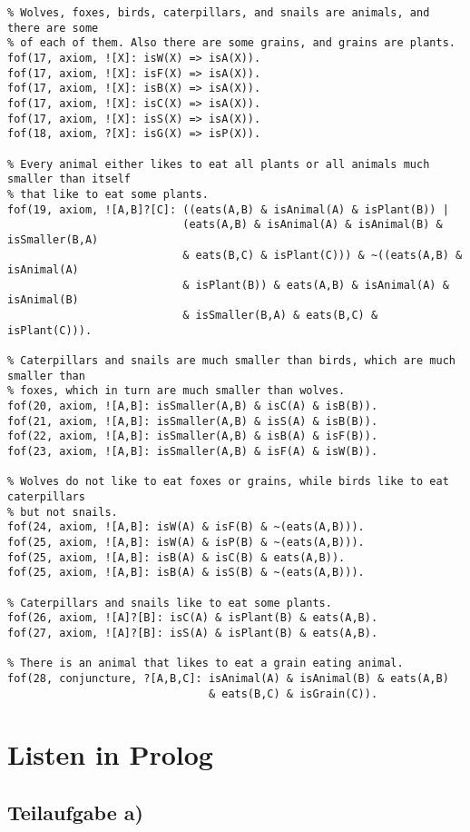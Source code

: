 \documentclass{article}
\begin{document}
\begin{verbatim}
% Wolves, foxes, birds, caterpillars, and snails are animals, and there are some
% of each of them. Also there are some grains, and grains are plants.
fof(17, axiom, ![X]: isW(X) => isA(X)).
fof(17, axiom, ![X]: isF(X) => isA(X)).
fof(17, axiom, ![X]: isB(X) => isA(X)).
fof(17, axiom, ![X]: isC(X) => isA(X)).
fof(17, axiom, ![X]: isS(X) => isA(X)).
fof(18, axiom, ?[X]: isG(X) => isP(X)).

% Every animal either likes to eat all plants or all animals much smaller than itself
% that like to eat some plants.
fof(19, axiom, ![A,B]?[C]: ((eats(A,B) & isAnimal(A) & isPlant(B)) |
                           (eats(A,B) & isAnimal(A) & isAnimal(B) & isSmaller(B,A)
                           & eats(B,C) & isPlant(C))) & ~((eats(A,B) & isAnimal(A)
                           & isPlant(B)) & eats(A,B) & isAnimal(A) & isAnimal(B)
                           & isSmaller(B,A) & eats(B,C) & isPlant(C))).

% Caterpillars and snails are much smaller than birds, which are much smaller than
% foxes, which in turn are much smaller than wolves.
fof(20, axiom, ![A,B]: isSmaller(A,B) & isC(A) & isB(B)).
fof(21, axiom, ![A,B]: isSmaller(A,B) & isS(A) & isB(B)).
fof(22, axiom, ![A,B]: isSmaller(A,B) & isB(A) & isF(B)).
fof(23, axiom, ![A,B]: isSmaller(A,B) & isF(A) & isW(B)).

% Wolves do not like to eat foxes or grains, while birds like to eat caterpillars
% but not snails.
fof(24, axiom, ![A,B]: isW(A) & isF(B) & ~(eats(A,B))).
fof(25, axiom, ![A,B]: isW(A) & isP(B) & ~(eats(A,B))).
fof(25, axiom, ![A,B]: isB(A) & isC(B) & eats(A,B)).
fof(25, axiom, ![A,B]: isB(A) & isS(B) & ~(eats(A,B))).

% Caterpillars and snails like to eat some plants.
fof(26, axiom, ![A]?[B]: isC(A) & isPlant(B) & eats(A,B).
fof(27, axiom, ![A]?[B]: isS(A) & isPlant(B) & eats(A,B).

% There is an animal that likes to eat a grain eating animal.
fof(28, conjuncture, ?[A,B,C]: isAnimal(A) & isAnimal(B) & eats(A,B)
                               & eats(B,C) & isGrain(C)).
\end{verbatim}

\section{Listen in Prolog}

\subsection{Teilaufgabe a)}
\end{document}
